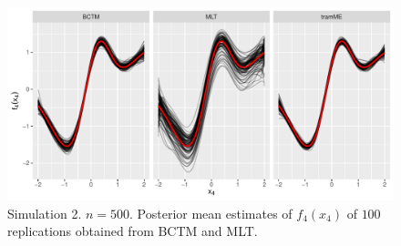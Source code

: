 \documentclass[12pt, a4paper]{article}
\begin{document}
\begin{figure}[!ht]
\centering
\includegraphics[width=\textwidth]{figs/coverage_f4_n500_wtramme.pdf}
\caption{\footnotesize Simulation 2. $n=500$. Posterior mean estimates of $f_4(x_4)$ of $100$ replications obtained from BCTM and MLT.}\label{fig:eff4_n500}
\end{figure}

\FloatBarrier




\end{document}
